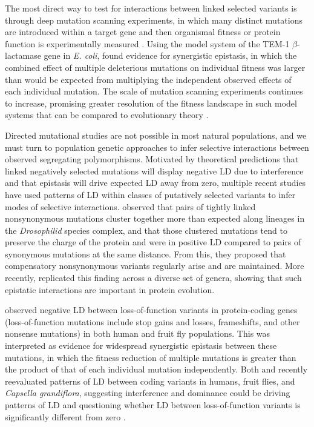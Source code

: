 \documentclass[]{article}
\begin{document}
The most direct way to test for interactions between linked selected variants
is through deep mutation scanning experiments, in which many distinct mutations
are introduced within a target gene and then organismal fitness or protein
function is experimentally measured \citep{Romero2009-yi, Bank2015-vq,
Puchta2016-rx, Steinberg2016-is}. Using the model system of the
TEM-1 \(\beta\)-lactamase gene in \emph{E. coli}, \citet{Bershtein2006-bk}
found evidence for synergistic epistasis, in which the combined effect of
multiple deleterious mutations on individual fitness was larger than would be
expected from multiplying the independent observed effects of each individual
mutation. The scale of mutation scanning experiments continues to increase,
promising greater resolution of the fitness landscape in such model systems
that can be compared to evolutionary theory \citep{Otwinowski2018-zk}.

Directed mutational studies are not possible in most natural populations, and
we must turn to population genetic approaches to infer selective interactions
between observed segregating polymorphisms. Motivated by theoretical
predictions that linked negatively selected mutations will display negative LD
due to interference \citep{Hill1966-gv} and that epistasis will drive expected
LD away from zero, multiple recent studies have used patterns of LD within
classes of putatively selected variants to infer modes of selective
interactions. \citet{Callahan2011-ac} observed that pairs of tightly linked
nonsynonymous mutations cluster together more than expected along lineages in
the \emph{Drosophilid} species complex, and that those clustered mutations tend
to preserve the charge of the protein and were in positive LD compared to pairs
of synonymous mutations at the same distance. From this, they proposed that
compensatory nonsynonymous variants regularly arise and are maintained. More
recently, \citet{Taverner2020-lk} replicated this finding across a diverse set
of genera, showing that such epistatic interactions are important in protein
evolution.

\citet{Sohail2017-zq} observed negative LD between loss-of-function variants in
protein-coding genes (loss-of-function mutations include stop gains and losses,
frameshifts, and other nonsense mutations) in both human and fruit fly
populations. This was interpreted as evidence for widespread synergistic
epistasis between these mutations, in which the fitness reduction of multiple
mutations is greater than the product of that of each individual mutation
independently. Both \citet{Sandler2021-of} and \citet{Garcia2021-zn}
recently reevaluated patterns of LD between coding variants in humans, fruit
flies, and \emph{Capsella grandiflora}, suggesting interference and
dominance could be driving patterns of LD \citep{Garcia2021-zn} and
questioning whether LD between loss-of-function variants is significantly
different from zero \citep{Sandler2021-of}.
\end{document}

